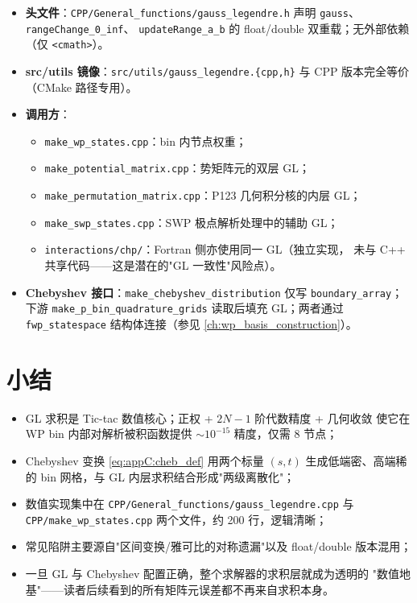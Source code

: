 \begin{itemize}
\item \textbf{头文件}：\texttt{CPP/General\_functions/gauss\_legendre.h}
      声明 \texttt{gauss}、\texttt{rangeChange\_0\_inf}、
      \texttt{updateRange\_a\_b} 的 float/double 双重载；无外部依赖（仅
      \texttt{<cmath>}）。
\item \textbf{src/utils 镜像}：\texttt{src/utils/gauss\_legendre.\{cpp,h\}}
      与 CPP 版本完全等价（CMake 路径专用）。
\item \textbf{调用方}：
      \begin{itemize}
      \item \texttt{make\_wp\_states.cpp}：bin 内节点权重；
      \item \texttt{make\_potential\_matrix.cpp}：势矩阵元的双层 GL；
      \item \texttt{make\_permutation\_matrix.cpp}：P123 几何积分核的内层 GL；
      \item \texttt{make\_swp\_states.cpp}：SWP 极点解析处理中的辅助 GL；
      \item \texttt{interactions/chp/}：Fortran 侧亦使用同一 GL（独立实现，
            未与 C++ 共享代码——这是潜在的"GL 一致性"风险点）。
      \end{itemize}
\item \textbf{Chebyshev 接口}：\texttt{make\_chebyshev\_distribution} 仅写
      \texttt{boundary\_array}；下游 \texttt{make\_p\_bin\_quadrature\_grids}
      读取后填充 GL；两者通过 \texttt{fwp\_statespace} 结构体连接（参见
      \cref{ch:wp_basis_construction}）。
\end{itemize}

\section{小结}

\begin{itemize}
\item GL 求积是 Tic-tac 数值核心；正权 + $2N-1$ 阶代数精度 + 几何收敛
      使它在 WP bin 内部对解析被积函数提供 $\sim 10^{-15}$ 精度，仅需 8 节点；
\item Chebyshev 变换 \eqref{eq:appC:cheb_def} 用两个标量 $(s,t)$
      生成低端密、高端稀的 bin 网格，与 GL 内层求积结合形成"两级离散化"；
\item 数值实现集中在 \texttt{CPP/General\_functions/gauss\_legendre.cpp}
      与 \texttt{CPP/make\_wp\_states.cpp} 两个文件，约 200 行，逻辑清晰；
\item 常见陷阱主要源自"区间变换/雅可比的对称遗漏"以及 float/double 版本混用；
\item 一旦 GL 与 Chebyshev 配置正确，整个求解器的求积层就成为透明的
      "数值地基"——读者后续看到的所有矩阵元误差都不再来自求积本身。
\end{itemize}
